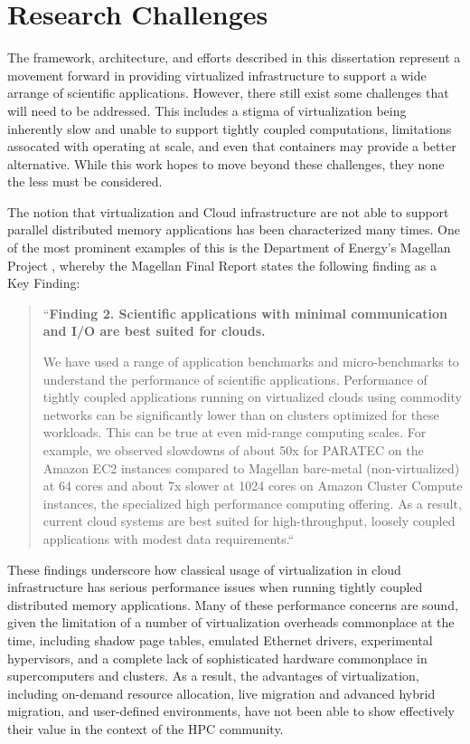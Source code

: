 \section{Research Challenges}
\label{sec:chall}

The framework, architecture, and efforts described in this dissertation represent a movement forward in providing virtualized infrastructure to support a wide arrange of scientific applications. However, there still exist some challenges that will need to be addressed.  This includes a stigma of virtualization being inherently slow and unable to support tightly coupled computations, limitations assocated with  operating at scale, and even that containers may provide a better alternative.  While this work hopes to move beyond these challenges, they none the less must be considered. 

The notion that virtualization and Cloud infrastructure are not able to support parallel distributed memory applications has been characterized many times. One of the most prominent examples of this is the Department of Energy's Magellan Project \cite{www-magellan}, whereby the Magellan Final Report \cite{MagellanFinal} states the following finding as a Key Finding:
  
\begin{quote}
``\textbf{Finding 2. Scientific applications with minimal communication and I/O are best suited for clouds.}

We have used a range of application benchmarks and micro-benchmarks to understand the performance of scientific applications. Performance of tightly coupled applications running on virtualized clouds using commodity networks can be significantly lower than on clusters optimized for these workloads. This can be true at even mid-range computing scales. For example, we observed slowdowns of about 50x for PARATEC on the Amazon EC2 instances compared to Magellan bare-metal (non-virtualized) at 64 cores and about 7x slower at 1024 cores on Amazon Cluster Compute instances, the specialized high performance computing offering. As a result, current cloud systems are best suited for high-throughput, loosely coupled applications with modest data requirements.``
\end{quote}

These findings underscore how classical usage of virtualization in cloud infrastructure has serious performance issues when running tightly coupled distributed memory applications. Many of these performance concerns are sound, given the limitation of a number of virtualization overheads commonplace at the time, including shadow page tables, emulated Ethernet drivers, experimental hypervisors, and a complete lack of sophisticated hardware commonplace in supercomputers and clusters.  As a result, the advantages of virtualization, including on-demand resource allocation, live migration and advanced hybrid migration, and user-defined environments, have not been able to show effectively their value in the context of the HPC community.

